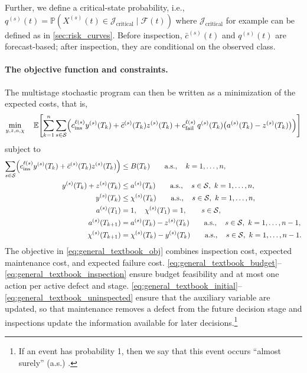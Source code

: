 \documentclass{article}
\begin{document}
Further, we define a critical-state probability, i.e., 
$
q^{(s)}(t) = \mathds P\left(X^{(s)}(t) \in \mathcal J_{\text{critical}} \mid \mathcal F(t) \right)
$ 
where $\mathcal J_{\text{critical}}$ for example can be defined as in \cref{sec:risk_curves}.
Before inspection, $\bar c^{(s)}(t)$ and $q^{(s)}(t)$ are forecast-based; after inspection, they are conditional on the observed class.

\paragraph{The objective function and constraints.}
The multistage stochastic program can then be written as a minimization of the expected costs, that is,
\begin{align}
\min_{y,z,a,\chi}\quad
\mathbb E\!\left[
\sum_{k=1}^n\sum_{s\in\mathcal S}
\Bigl(
c_{\mathrm{ins}}^{\ell(s)} y^{(s)}(T_k)
+ \bar c^{(s)}(T_k) z^{(s)}(T_k)
+ c_{\mathrm{fail}}^{\ell(s)}\,q^{(s)}(T_k)\bigl(a^{(s)}(T_k)-z^{(s)}(T_k)\bigr)
\Bigr)
\right]
\label{eq:general_textbook_obj}
\end{align}
subject to
\begin{align}
\sum_{s\in\mathcal S}
\Bigl(
c^{\ell(s)}_{\mathrm{ins}} y^{(s)} (T_k)
+ \bar c^{(s)}(T_k) z^{(s)}(T_k)
\Bigr)
&\le B(T_k)
\qquad \text{a.s.},\quad k = 1,\dots,n,
\label{eq:general_textbook_budget}\\
y^{(s)}(T_k)+z^{(s)}(T_k)
&\le a^{(s)}(T_k)
\qquad \text{a.s.},\quad s\in\mathcal S,\  k = 1,\dots,n,
\label{eq:general_textbook_exclusive}\\
y^{(s)}(T_k)
&\le \chi^{(s)}(T_k)
\qquad \text{a.s.},\quad s\in\mathcal S,\  k = 1,\dots,n,
\label{eq:general_textbook_inspection}\\
a^{(s)}(T_1)&=1,\quad \chi^{(s)}(T_1)=1,
\qquad s\in\mathcal S,
\label{eq:general_textbook_initial}\\
a^{(s)}(T_{k+1})&=a^{(s)}(T_k)-z^{(s)}(T_k)
\qquad \text{a.s.},\quad s\in\mathcal S,\ k=1,\dots,n-1,
\label{eq:general_textbook_activity}\\
\chi^{(s)}(T_{k+1})&=\chi^{(s)}(T_k)-y^{(s)}(T_k)
\qquad \text{a.s.},\quad s\in\mathcal S,\ k=1,\dots,n-1.
\label{eq:general_textbook_uninspected}
\end{align}
The objective in \cref{eq:general_textbook_obj} combines inspection cost, expected maintenance cost, and expected failure cost. 
\cref{eq:general_textbook_budget}--\cref{eq:general_textbook_inspection} ensure budget feasibility and at most one action per active defect and stage.
\cref{eq:general_textbook_initial}--\cref{eq:general_textbook_uninspected} ensure that the auxiliary variable are updated, so that maintenance removes a defect from the future decision stage and inspections update the information available for later decisions.\footnote{If an event has probability 1, then we say that this event occurs ``almost surely'' (a.s.) \citep[Chapter 3]{thygesen2023a}.}
\end{document}
